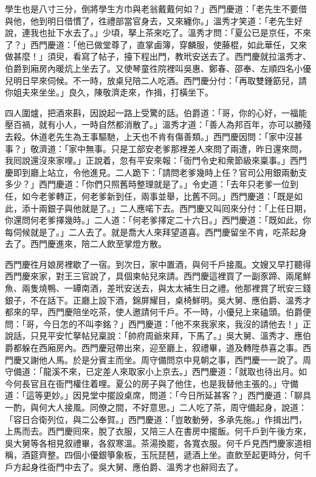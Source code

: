 學生也是八寸三分，倒將學生方巾與老翁戴戴何如？」西門慶道：「老先生不要借與他，他到明日借慣了，徃禮部當官身去，又來纏你。」溫秀才笑道：「老先生好說，連我也扯下水去了。」少頃，拏上茶來吃了。溫秀才問：「夏公已是京任，不來了？」{}西門慶道：「他已做堂尊了，直掌鹵簿，穿麟服，使藤棍，如此華任，又來做甚麼！」須臾，看寫了帖子，擡下程出門，教玳安送去了。西門慶就拉溫秀才、伯爵到廂房內暖炕上坐去了。又使琴童徃院裡叫吳惠、鄭春、邵奉、左順四名小優兒明日早來伺候。不一時，放桌兒陪二人吃酒。西門慶分付：「再取雙鍾筯兒，請你姐夫來坐坐。」良久，陳敬濟走來，作揖，打橫坐下。

四人圍爐，把酒來斟，因說起一路上受驚的話。伯爵道：「哥，你的心好，一福能壓百禍，就有小人，一時自然都消散了。」溫秀才道：「善人為邦百年，亦可以勝殘去殺。休道老先生為王事驅馳，上天也不肯有傷善類。」{}西門慶因問：「家中沒甚事？」敬濟道：「家中無事。只是工部安老爹那裡差人來問了兩遭，昨日還來問，我囘說還沒來家哩。」正說着，忽有平安來報：「衙門令史和衆節級來稟事。」西門慶即到廳上站立，令他進見。二人跪下：「請問老爹幾時上任？官司公用銀兩動支多少？」西門慶道：「你們只照舊時整理就是了。」令史道：「去年只老爹一位到任，如今老爹轉正，何老爹新到任，兩事並舉，比舊不同。」西門慶道：「既是如此，添十兩銀子與他就是了。」二人應喏下去。西門慶又叫囘來分付：「上任日期，你還問何老爹擇幾時。」二人道：「何老爹擇定二十六日。」西門慶道：「既如此，你每伺候就是了。」二人去了。就是喬大人來拜望道喜。西門慶留坐不肯，吃茶起身去了。西門慶進來，陪二人飲至掌燈方散。

西門慶徃月娘房裡歇了一宿。到次日，家中置酒，與何千戶接風。文嫂又早打聽得西門慶來家，對王三官說了，具個柬帖兒來請。西門慶這裡買了一副豕蹄、兩尾鮮魚、兩隻燒鴨、一罈南酒，差玳安送去，與太太補生日之禮。他那裡賞了玳安三錢銀子，不在話下。正廳上設下酒，錦屏耀目，桌椅鮮明。吳大舅、應伯爵、溫秀才都來的早，西門慶陪坐吃茶，使人邀請何千戶。不一時，小優兒上來磕頭。伯爵便問：「哥，今日怎的不叫李銘？」西門慶道：「他不來我家來，我沒的請他去！」{}正說話，只見平安忙拏帖兒稟說：「帥府周爺來拜，下馬了。」吳大舅、溫秀才、應伯爵都躲在西廂房內。西門慶冠帶出來，迎至廳上，叙禮畢，道及轉陞恭喜之事。西門慶又謝他人馬。於是分賓主而坐。周守備問京中見朝之事，西門慶一一說了。周守備道：「龍溪不來，已定差人來取家小上京去。」西門慶道：「就取也待出月。如今何長官且在衙門權住着哩。夏公的房子與了他住，也是我替他主張的。」守備道：「這等更妙。」因見堂中擺設桌席，問道：「今日所延甚客？」西門慶道：「聊具一酌，與何大人接風。同僚之間，不好意思。」二人吃了茶，周守備起身，說道：「容日合衛列位，與二公奉賀。」西門慶道：「豈敢動勞，多承先施。」作揖出門，上馬而去。西門慶囘來，脫了衣服，又陪三人在書房中擺飯。何千戶到午後方來，吳大舅等各相見叙禮畢，各叙寒溫。茶湯換罷，各寬衣服。何千戶見西門慶家道相稱，酒筵齊整。四個小優銀箏象板，玉阮琵琶，遞酒上坐。直飲至起更時分，何千戶方起身徃衙門中去了。吳大舅、應伯爵、溫秀才也辭囘去了。

